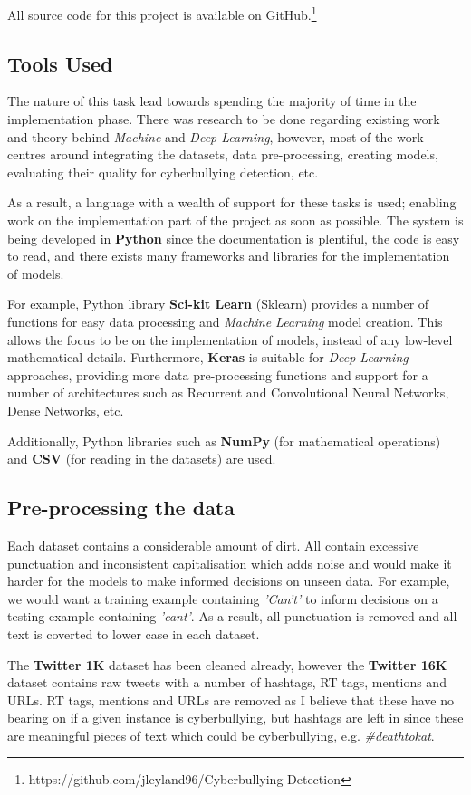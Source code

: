 \documentclass[12pt,a4paper]{article}
\begin{document}
All source code for this project is available on GitHub.\footnote{https://github.com/jleyland96/Cyberbullying-Detection}

\subsection{Tools Used}
The nature of this task lead towards spending the majority of time in the implementation phase. There was research to be done regarding existing work and theory behind \textit{Machine} and \textit{Deep Learning}, however, most of the work centres around integrating the datasets, data pre-processing, creating models, evaluating their quality for cyberbullying detection, etc. 

As a result, a language with a wealth of support for these tasks is used; enabling work on the implementation part of the project as soon as possible. The system is being developed in \textbf{Python} since the documentation is plentiful, the code is easy to read, and there exists many frameworks and libraries for the implementation of models.

For example, Python library \textbf{Sci-kit Learn} (Sklearn) provides a number of functions for easy data processing and \textit{Machine Learning} model creation. This allows the focus to be on the implementation of models, instead of any low-level mathematical details. Furthermore, \textbf{Keras} is suitable for \textit{Deep Learning} approaches, providing more data pre-processing functions and support for a number of architectures such as Recurrent and Convolutional Neural Networks, Dense Networks, etc. 

Additionally, Python libraries such as \textbf{NumPy} (for mathematical operations) and \textbf{CSV} (for reading in the datasets) are used.

\subsection{Pre-processing the data}
Each dataset contains a considerable amount of dirt. All contain excessive punctuation and inconsistent capitalisation which adds noise and would make it harder for the models to make informed decisions on unseen data. For example, we would want a training example containing \textit{'Can't'} to inform decisions on a testing example containing \textit{'cant'}. As a result, all punctuation is removed and all text is coverted to lower case in each dataset. 

The \textbf{Twitter 1K} dataset has been cleaned already, however the \textbf{Twitter 16K} dataset contains raw tweets with a number of hashtags, RT tags, mentions and URLs. RT tags, mentions and URLs are removed as I believe that these have no bearing on if a given instance is cyberbullying, but hashtags are left in since these are meaningful pieces of text which could be cyberbullying, e.g. \textit{\#deathtokat}.
\end{document}
